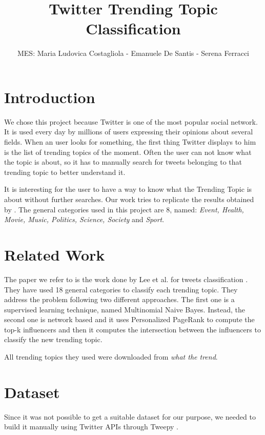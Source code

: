 \documentclass[journal,11pt]{vgtc}
\title{Twitter Trending Topic Classification}
\author{MES: Maria Ludovica Costagliola - Emanuele De Santis - Serena Ferracci}
\begin{document}
\maketitle

\section{Introduction}
We chose this project because Twitter is one of the most popular social network. 
It is used every day by millions of users expressing their opinions about several fields.
When an user looks for something, the first thing Twitter displays to him is the list of 
trending topics of the moment. Often the user can not know what the topic is about, so it has to manually 
search for tweets belonging to that trending topic to better understand it.

It is interesting for the user to have a way to know what the Trending Topic is about
without further searches.
Our work tries to replicate the results obtained by \cite{lee_palsetia_narayanan_patwary_agrawal_choudhary_2011}.  
The general categories used in this project are 8, named: \textit{Event, Health, Movie, Music, Politics, Science, Society} and \textit{Sport}.


\section{Related Work}
The paper we refer to is the work done by Lee et al. for tweets classification \cite{lee_palsetia_narayanan_patwary_agrawal_choudhary_2011}. 
They have used 18 general categories to classify each trending topic.
They address the problem following two different approaches. The first one is a supervised learning technique, named
Multinomial Naive Bayes. Instead, the second one is network based and it uses Personalized PageRank to compute the 
top-k influencers and then it computes the intersection between the influencers to classify the new trending topic.

All trending topics they used were downloaded from \textit{what the trend}.

\section{Dataset}
Since it was not possible to get a suitable dataset for our purpose, we needed to build it manually
using Twitter APIs \cite{twitter} through Tweepy \cite{api}.
\end{document}
